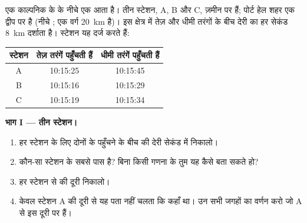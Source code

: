 \begin{problem}
\label{pb:g7:earthquakes:1}
एक काल्पनिक  के  के नीचे एक  आता है। तीन  स्टेशन, A, B
और C, ज़मीन पर हैं; पोर्ट हेल शहर एक द्वीप पर है (नीचे ; एक वर्ग
\qty{20}{km} है)। इस क्षेत्र में तेज़ और धीमी तरंगों के बीच देरी का हर सेकंड
\qty{8}{km} दर्शाता है। स्टेशन यह
दर्ज करते हैं:

\begin{center}
\small
\begin{tabular}{|c|c|c|}
\hline
\textbf{स्टेशन} & \textbf{तेज़ तरंगें पहुँचती हैं} & \textbf{धीमी तरंगें पहुँचती हैं} \\
\hline
A & 10:15:25 & 10:15:45 \\
B & 10:15:16 & 10:15:29 \\
C & 10:15:19 & 10:15:34 \\
\hline
\end{tabular}
\end{center}

\medskip
\noindent\textbf{भाग I --- तीन स्टेशन।}\par\nopagebreak
\begin{enumerate}[beginpenalty=10000]
  \item हर स्टेशन के लिए दोनों के पहुँचने के बीच की देरी सेकंड में
        निकालो।
  \item कौन-सा स्टेशन  के सबसे पास है? बिना किसी गणना के तुम यह कैसे बता
        सकते हो?
  \item हर स्टेशन से  की दूरी निकालो।
  \item केवल स्टेशन A की दूरी से यह पता नहीं चलता कि  कहाँ था। उन सभी
        जगहों का वर्णन करो जो A से इस दूरी पर हैं।
\end{enumerate}


\end{problem}

